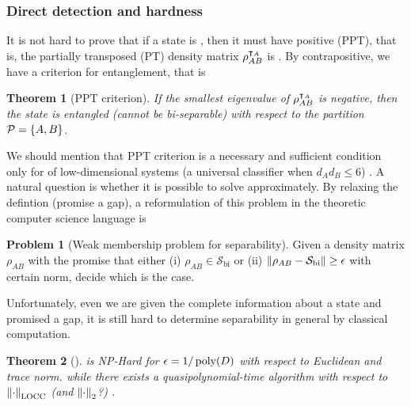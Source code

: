 \documentclass[
reprint,
aps,
pra,
floatfix,
]{revtex4-2}
\theoremstyle{plain}
\newtheorem{theorem}{Theorem}
\theoremstyle{definition}
\newtheorem{problem}{Problem}
\newcommand{\dm}{\rho}
\newcommand{\bi}{\text{bi}}
\newcommand{\ppt}{\textup{PPT}}
\newcommand{\locc}{\textup{LOCC}}
\newcommand{\separable}{\mathcal{S}}
\newcommand{\ppartition}{\mathcal{P}}
\begin{document}
\subsubsection{Direct detection and hardness}
It is not hard to prove that if a state is , then it must have positive  (PPT), 
that is, the partially transposed (PT) density matrix $\dm_{AB}^{\T_A}$ is  \cite{peresSeparabilityCriterionDensity1996}.
By contrapositive, we have a criterion for entanglement, that is
\begin{theorem}[PPT criterion]\label{thm:ppt}
	If the smallest eigenvalue of  $\dm_{AB}^{\T_A}$ is negative, then the state is entangled (cannot be bi-separable) with respect to the partition $\ppartition=\qty{A,B}$.
\end{theorem}
We should mention that PPT criterion is a necessary and sufficient condition only for  of low-dimensional systems 
(a universal classifier when $d_A d_B \le 6$) \cite{horodeckiSeparabilityMixedStates1996}.
A natural question is whether it is possible to solve  approximately.
By relaxing the defintion (promise a gap), a reformulation of this problem in the theoretic computer science language is
\begin{problem}[Weak membership problem for separability]\label{prm:weak_membership problem_for_separability}
	Given a density matrix $\dm_{AB}$ with the promise that either (i) $\dm_{AB}\in \separable_{\bi}$ or (ii) $\norm{\dm_{AB}-\separable_{\bi}}\ge \epsilon$ with certain norm, decide which is the case.
\end{problem}
Unfortunately, even we are given the complete information about a state and promised a gap, it is still hard to determine separability in general by classical computation.
\begin{theorem}[\cite{gurvitsClassicalDeterministicComplexity2003}]
	 is NP-Hard for $\epsilon=1/\operatorname{\textup{poly}}(D)$ with respect to Euclidean  and trace norm.
	\cite{ioannouComputationalComplexityQuantum2007}
	\cite{dohertyCompleteFamilySeparability2004}
	while there exists a quasipolynomial-time algorithm with respect to $\norm{\cdot}_{\locc}$ (and $\norm{\cdot}_2$?) \cite{brandaoQuasipolynomialtimeAlgorithmQuantum2011}.
\end{theorem}
\end{document}
